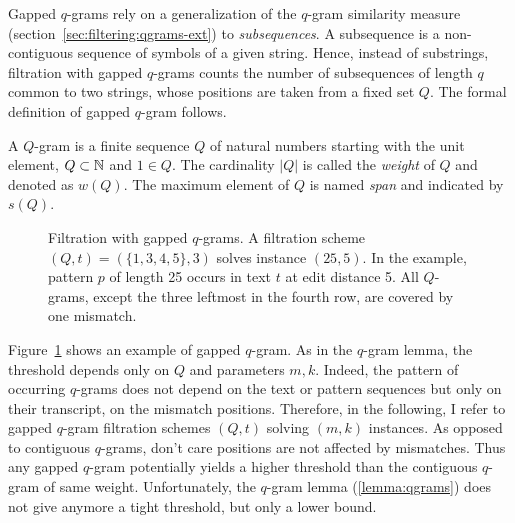 Gapped $q$-grams rely on a generalization of the $q$-gram similarity measure (section~\ref{sec:filtering:qgrams-ext}) to \emph{subsequences}.
A subsequence is a non-contiguous sequence of symbols of a given string.
Hence, instead of substrings, filtration with gapped $q$-grams counts the number of subsequences of length $q$ common to two strings, whose positions are taken from a fixed set $Q$.
The formal definition of gapped $q$-gram follows.

\begin{definition}
A $Q$-gram is a finite sequence $Q$ of natural numbers starting with the unit element, \ie $Q \subset \mathbb {N}$ and $1 \in Q$.
The cardinality $|Q|$ is called the \emph{weight} of $Q$ and denoted as $w(Q)$.
The maximum element of $Q$ is named \emph{span} and indicated by $s(Q)$.
\end{definition}

\begin{figure}[h]
\begin{center}
\caption[Filtration with gapped $q$-grams]{Filtration with gapped $q$-grams. A filtration scheme $(Q,t) = (\{1, 3, 4, 5\},3)$ solves instance $(25,5)$. In the example, pattern $p$ of length 25 occurs in text $t$ at edit distance 5. All $Q$-grams, except the three leftmost in the fourth row, are covered by one mismatch.}
\label{fig:qgrams-gapped}

\end{center}
\end{figure}

Figure~\ref{fig:qgrams-gapped} shows an example of gapped $q$-gram.
As in the $q$-gram lemma, the threshold depends only on $Q$ and parameters $m,k$.
Indeed, the pattern of occurring $q$-grams does not depend on the text or pattern sequences but only on their transcript, \ie on the mismatch positions.
Therefore, in the following, I refer to gapped $q$-gram filtration schemes $(Q,t)$ solving $(m,k)$ instances.
As opposed to contiguous $q$-grams, don't care positions are not affected by mismatches.
Thus any gapped $q$-gram potentially yields a higher threshold than the contiguous $q$-gram of same weight.
Unfortunately, the $q$-gram lemma (\ref{lemma:qgrams}) does not give anymore a tight threshold, but only a lower bound.

